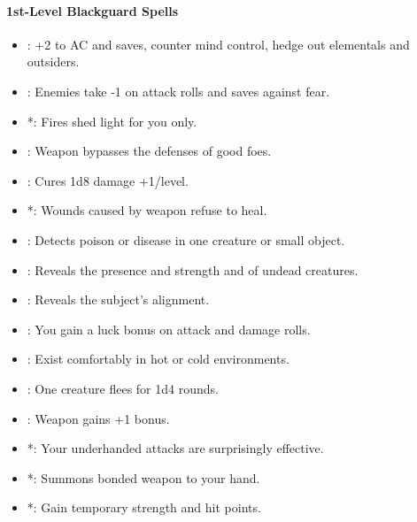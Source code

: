 \paragraph{1st-Level Blackguard Spells}
\begin{itemize}
\item {}: +2 to AC and saves, counter mind control, hedge out elementals and outsiders.
\item {}: Enemies take -1 on attack rolls and saves against fear.%
\item {}*: Fires shed light for you only. %
\item {}: Weapon bypasses the defenses of good foes. %
\item {}: Cures 1d8 damage +1/level.
\item {}*: Wounds caused by weapon refuse to heal. %
\item {}: Detects poison or disease in one creature or small object.
\item {}: Reveals the presence and strength and of undead creatures.
\item {}: Reveals the subject's alignment.
\item {}: You gain a luck bonus on attack and damage rolls.
\item {}: Exist comfortably in hot or cold environments.
\item {}: One creature flees for 1d4 rounds. %
\item {}: Weapon gains +1 bonus.
\item {}*: Your underhanded attacks are surprisingly effective. %
\item {}*: Summons bonded weapon to your hand.
\item {}*: Gain temporary strength and hit points.
\end{itemize}
